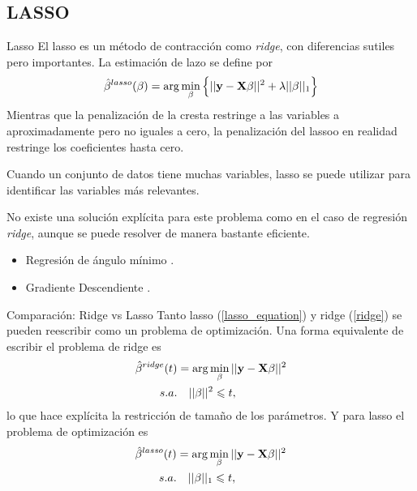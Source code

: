 \subsection{LASSO}
\begin{frame}{Lasso}
    El lasso es un método de contracción como \textit{ridge}, con diferencias sutiles pero importantes. La estimación de lazo se define por \citep{lasso_original}
\begin{align} \label{lasso_equation}
\hat{\beta}^{lasso}(\beta) = \arg \min_{\beta} \left\{||\mathbf{y}- \mathbf{X} \beta||^2+\lambda||\beta||_1 \right\}
\end{align}
Mientras que la penalización de la cresta restringe a las variables a aproximadamente pero no iguales a cero, la penalización del lassoo en realidad restringe los coeficientes hasta cero. 

Cuando un conjunto de datos tiene muchas variables, lasso se puede utilizar para identificar las variables más relevantes.
\end{frame}

\begin{frame}
No existe una solución explícita para este problema como en el caso de regresión \textit{ridge}, aunque se puede resolver de manera bastante eficiente.

\begin{itemize}
    \item Regresión de ángulo mínimo \citep{lars_efron}.
    
    \item Gradiente Descendiente \citep{statisticallearning}.
\end{itemize}
\end{frame}


\begin{frame}{Comparación: Ridge vs Lasso}
Tanto lasso (\ref{lasso_equation}) y ridge (\ref{ridge}) se pueden reescribir como un problema de optimización.
Una forma equivalente de escribir el problema de ridge es
\begin{align}\label{ridge_equi}
    \hat{\beta}^{ridge}(t) &= \arg \min_{\beta} ||\mathbf{y}-\mathbf{X}\beta||^2\\
    s.a.&\ \ \  ||\beta||^2\leqslant t,
\end{align}
lo que hace explícita la restricción de tamaño de los parámetros. Y para lasso el problema de optimización es
\begin{align}\label{lasso_equation_opti}
    \hat{\beta}^{lasso}(t) &= \arg \min_{\beta} ||\mathbf{y}-\mathbf{X}\beta||^2\\
    s.a.&\ \ \  ||\beta||_1\leqslant t,
\end{align}
\end{frame}

